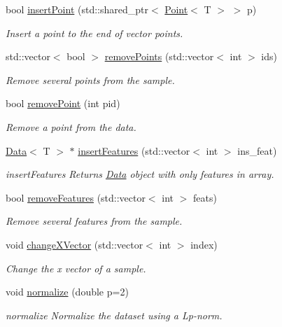 \begin{DoxyCompactItemize}
bool \hyperlink{class_data_a709cae94a533608e61a5e1e5039b0b35}{insert\+Point} (std\+::shared\+\_\+ptr$<$ \hyperlink{class_point}{Point}$<$ T $>$ $>$ p)
\begin{DoxyCompactList}\small\item\em Insert a point to the end of vector points. \end{DoxyCompactList}\item 
std\+::vector$<$ bool $>$ \hyperlink{class_data_ae5a3ca86bedc35bef909aac993439827}{remove\+Points} (std\+::vector$<$ int $>$ ids)
\begin{DoxyCompactList}\small\item\em Remove several points from the sample. \end{DoxyCompactList}\item 
bool \hyperlink{class_data_a92ad77892fa46016d890d4ef4954ef2f}{remove\+Point} (int pid)
\begin{DoxyCompactList}\small\item\em Remove a point from the data. \end{DoxyCompactList}\item 
\hyperlink{class_data}{Data}$<$ T $>$ $\ast$ \hyperlink{class_data_adfd307ae8437b7b2da4372eb604a2c43}{insert\+Features} (std\+::vector$<$ int $>$ ins\+\_\+feat)
\begin{DoxyCompactList}\small\item\em insert\+Features Returns \hyperlink{class_data}{Data} object with only features in array. \end{DoxyCompactList}\item 
bool \hyperlink{class_data_a574b881ce5042c5a13d79c187aa3f923}{remove\+Features} (std\+::vector$<$ int $>$ feats)
\begin{DoxyCompactList}\small\item\em Remove several features from the sample. \end{DoxyCompactList}\item 
void \hyperlink{class_data_a9cf86608e6a02b80c9755646d7cb55fb}{change\+X\+Vector} (std\+::vector$<$ int $>$ index)
\begin{DoxyCompactList}\small\item\em Change the x vector of a sample. \end{DoxyCompactList}\item 
void \hyperlink{class_data_a3271dd8204296537222ed74c5aab1a03}{normalize} (double p=2)
\begin{DoxyCompactList}\small\item\em normalize Normalize the dataset using a Lp-\/norm. \end{DoxyCompactList}\item 

\end{DoxyCompactItemize}
